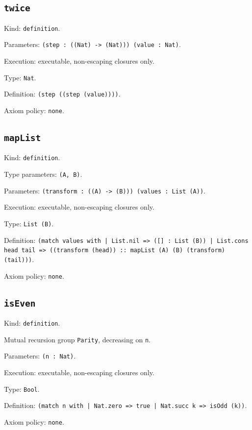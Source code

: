 \documentclass[11pt]{article}
\begin{document}
\subsection*{\texttt{twice}}
\noindent Kind: \texttt{definition}.\par
\noindent Parameters: \texttt{(step : ((Nat) -> (Nat))) (value : Nat)}.\par
\noindent Execution: executable, non-escaping closures only.\par
\noindent Type: \texttt{Nat}.\par
\noindent Definition: \texttt{(step ((step (value))))}.\par
\noindent Axiom policy: \texttt{none}.\par
\subsection*{\texttt{mapList}}
\noindent Kind: \texttt{definition}.\par
\noindent Type parameters: \texttt{(A, B)}.\par
\noindent Parameters: \texttt{(transform : ((A) -> (B))) (values : List (A))}.\par
\noindent Execution: executable, non-escaping closures only.\par
\noindent Type: \texttt{List (B)}.\par
\noindent Definition: \texttt{(match values with | List.nil => ([] : List (B)) | List.cons head tail => ((transform (head)) :: mapList (A) (B) (transform) (tail)))}.\par
\noindent Axiom policy: \texttt{none}.\par
\subsection*{\texttt{isEven}}
\noindent Kind: \texttt{definition}.\par
\noindent Mutual recursion group \texttt{Parity}, decreasing on \texttt{n}.\par
\noindent Parameters: \texttt{(n : Nat)}.\par
\noindent Execution: executable, non-escaping closures only.\par
\noindent Type: \texttt{Bool}.\par
\noindent Definition: \texttt{(match n with | Nat.zero => true | Nat.succ k => isOdd (k))}.\par
\noindent Axiom policy: \texttt{none}.\par
\end{document}
